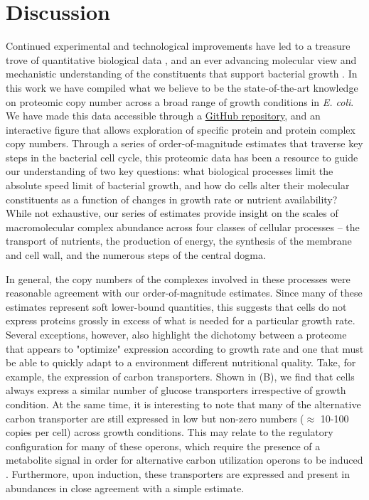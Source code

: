 \section{Discussion}
Continued experimental and technological improvements have led to a treasure
trove of quantitative biological data \citep{hui2015, schmidt2016, si2017,
gallagher2020, peebo2015, valgepea2013}, and an ever advancing molecular view
and mechanistic understanding of the constituents that support bacterial
growth \citep{taheriaraghi2015, morgenstein2015, si2019, karr2012,
kostinski2020}. In this work we have compiled what we believe to be the
state-of-the-art knowledge on proteomic copy number across a broad range of
growth conditions in \textit{E. coli}. We have made this data accessible
through a \href{https://github.com/RPGroup-PBoC/growth_limits}{GitHub
repository}, and an interactive figure that allows exploration of specific
protein and protein complex copy numbers. Through a series of
order-of-magnitude estimates that traverse key steps in the bacterial cell
cycle, this proteomic data has been a resource to guide our understanding of
two key questions: what biological processes limit the absolute speed limit
of bacterial growth, and how do cells alter their molecular constituents as a
function of changes in growth rate or nutrient availability? While not
exhaustive, our series of estimates provide insight on the scales of
macromolecular complex abundance across four classes of cellular processes --
the transport of nutrients, the production of energy, the synthesis of the
membrane and cell wall, and the numerous steps of the central dogma.

In general, the copy numbers of the complexes involved in these processes were
reasonable agreement with our order-of-magnitude estimates. Since many of these
estimates represent soft lower-bound quantities, this suggests that cells do not
express proteins grossly in excess of what is needed for a particular growth
rate. Several exceptions, however, also highlight the dichotomy between a
proteome that appears to "optimize" expression according to growth rate and one
that must be able to quickly adapt to a environment different nutritional
quality. Take, for example, the expression of carbon transporters. Shown in
(B), we find that cells always express a similar number of
glucose transporters irrespective of growth condition. At the same time, it is
interesting to note that many of the alternative carbon transporter are still
expressed in low but non-zero numbers ($\approx$ 10-100 copies per cell) across
growth conditions. This may relate to the regulatory configuration for many of
these operons, which require the presence of a metabolite signal in order for
alternative carbon utilization operons to be induced \citep{monod1949,
laxhuber2020}. Furthermore, upon induction, these transporters are expressed and
present in abundances in close agreement with a simple estimate.

